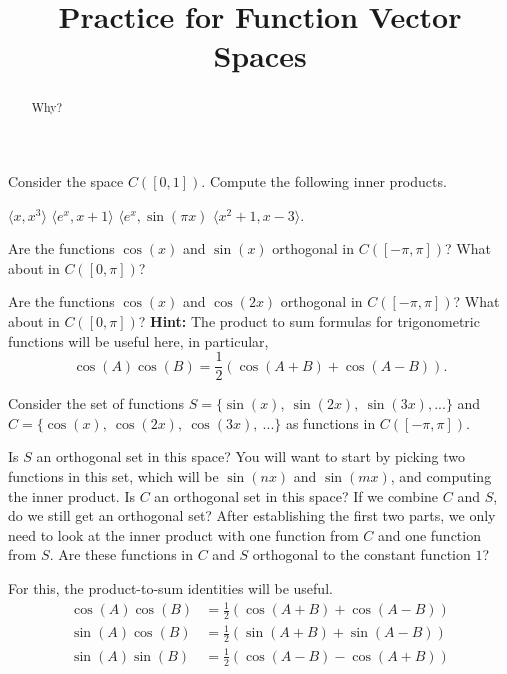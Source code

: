 \documentclass{ximera}
\title{Practice for Function Vector Spaces}
\begin{document}
\begin{abstract}
Why?
\end{abstract}
\maketitle



\begin{exercise}
    Consider the space $C([0,1])$. Compute the following inner products. 
    \begin{tasks}
        \task $\langle x, x^3 \rangle$
        \task $\langle e^x, x+1 \rangle$
        \task $\langle e^x, \sin(\pi x)$
        \task $\langle x^2 + 1, x - 3 \rangle$. 
    \end{tasks}
\end{exercise}

\begin{exercise}
    Are the functions $\cos(x)$ and $\sin(x)$ orthogonal in $C([-\pi, \pi])$? What about in $C([0,\pi])$?
\end{exercise}

\begin{exercise}
    Are the functions $\cos(x)$ and $\cos(2x)$ orthogonal in $C([-\pi, \pi])$? What about in $C([0,\pi])$? \textbf{Hint:} The product to sum formulas for trigonometric functions will be useful here, in particular,
    \[ 
        \cos(A)\cos(B) = \frac{1}{2}\left(\cos(A+B) + \cos(A-B)\right). 
    \]
\end{exercise}

\begin{exercise}
    Consider the set of functions $S = \{\sin(x),\ \sin(2x),\ \sin(3x), ... \}$ and $C = \{\cos(x),\  \cos(2x),\ \cos(3x),\ ... \}$ as functions in $C([-\pi, \pi])$. 
    \begin{tasks}
        \task Is $S$ an orthogonal set in this space? You will want to start by picking two functions in this set, which will be $\sin(nx)$ and $\sin(mx)$, and computing the inner product.
        \task Is $C$ an orthogonal set in this space?
        \task If we combine $C$ and $S$, do we still get an orthogonal set? After establishing the first two parts, we only need to look at the inner product with one function from $C$ and one function from $S$. 
        \task Are these functions in $C$ and $S$ orthogonal to the constant function $1$?
    \end{tasks}
    For this, the product-to-sum identities will be useful. 
    \[ 
        \begin{split}
            \cos(A)\cos(B) &= \frac{1}{2}\left(\cos(A+B) + \cos(A-B)\right)\\
            \sin(A)\cos(B) &= \frac{1}{2}\left(\sin(A+B) + \sin(A-B)\right) \\
            \sin(A)\sin(B) &= \frac{1}{2}\left(\cos(A-B) - \cos(A+B)\right)
        \end{split}
     \]
\end{exercise}
\end{document}
